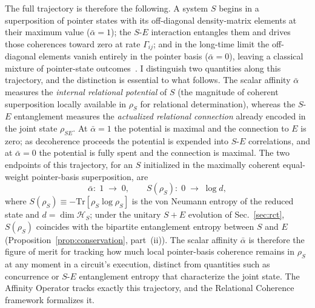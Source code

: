 The full trajectory is therefore the following.
A system $S$ begins in a superposition of pointer states with its
off-diagonal density-matrix elements at their maximum value
($\bar{\alpha} = 1$); the $S$-$E$ interaction entangles them and
drives those coherences toward zero at rate $\Gamma_{ij}$; and in
the long-time limit the off-diagonal elements vanish entirely in the
pointer basis ($\bar{\alpha} = 0$), leaving a classical mixture of
pointer-state outcomes~\cite{Zurek2003}.
I distinguish two quantities along this trajectory, and the
distinction is essential to what follows.
The scalar affinity $\bar{\alpha}$ measures the \emph{internal
relational potential} of $S$ (the magnitude of coherent superposition locally available in $\rho_S$ for relational determination), whereas
the $S$-$E$ entanglement measures the \emph{actualized relational
connection} already encoded in the joint state $\rho_{SE}$.
At $\bar{\alpha} = 1$ the potential is maximal and the connection
to $E$ is zero; as decoherence proceeds the potential is expended into
$S$-$E$ correlations, and at $\bar{\alpha} = 0$ the potential is fully
spent and the connection is maximal.
The two endpoints of this trajectory, for an $S$ initialized in the
maximally coherent equal-weight pointer-basis superposition, are
%
\begin{equation}
\label{eq:complementarity}
  \bar{\alpha}\!:\;1 \;\longrightarrow\; 0,
  \qquad
  S(\rho_S)\!:\;0 \;\longrightarrow\; \log d,
\end{equation}
%
where $S(\rho_S) \equiv -\mathrm{Tr}[\rho_S \log \rho_S]$ is the
von Neumann entropy of the reduced state and $d = \dim \mathcal{H}_S$;
under the unitary $S{+}E$ evolution of Sec.~\ref{sec:rct}, $S(\rho_S)$
coincides with the bipartite entanglement entropy between $S$ and $E$
(Proposition~\ref{prop:conservation}, part~(ii)).
The scalar affinity $\bar{\alpha}$ is therefore the figure of merit
for tracking how much local pointer-basis coherence remains in
$\rho_S$ at any moment in a circuit's execution, distinct from
quantities such as concurrence or $S$-$E$ entanglement entropy that
characterize the joint state.
The Affinity Operator tracks exactly this trajectory, and the
Relational Coherence framework formalizes it.
